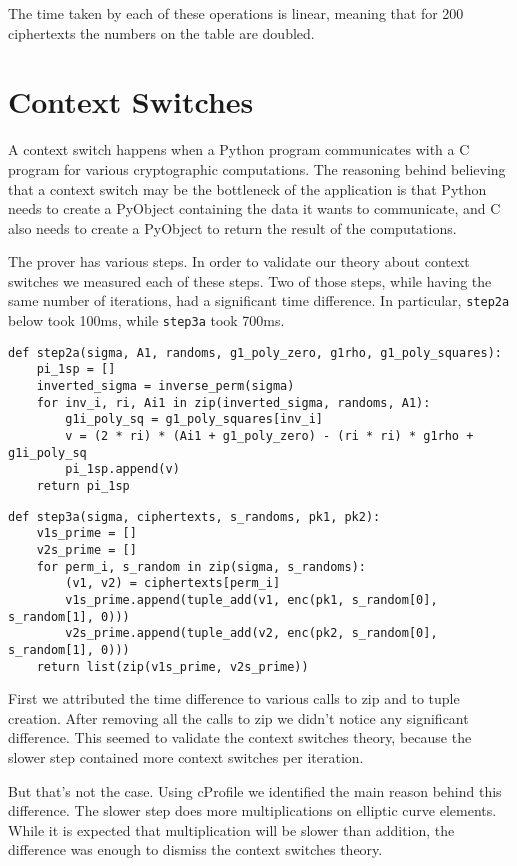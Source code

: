 \documentclass{article}
\begin{document}
The time taken by each of these operations is linear, meaning that for
200 ciphertexts the numbers on the table are doubled.

\section{Context Switches}

A context switch happens when a Python program communicates with a C
program for various cryptographic computations. The reasoning behind
believing that a context switch may be the bottleneck of the application
is that Python needs to create a PyObject containing the
data it wants to communicate, and C also needs to create a PyObject to
return the result of the computations.

The prover has various steps. In order to validate our theory about
context switches we measured each of these steps. Two of those steps,
while having the same number of iterations, had a significant time
difference. In particular, \texttt{step2a} below took
100ms, while \texttt{step3a} took 700ms.

\begin{verbatim}
def step2a(sigma, A1, randoms, g1_poly_zero, g1rho, g1_poly_squares):
    pi_1sp = []
    inverted_sigma = inverse_perm(sigma)
    for inv_i, ri, Ai1 in zip(inverted_sigma, randoms, A1):
        g1i_poly_sq = g1_poly_squares[inv_i]
        v = (2 * ri) * (Ai1 + g1_poly_zero) - (ri * ri) * g1rho + g1i_poly_sq
        pi_1sp.append(v)
    return pi_1sp
  \end{verbatim}

\begin{verbatim}
def step3a(sigma, ciphertexts, s_randoms, pk1, pk2):
    v1s_prime = []
    v2s_prime = []
    for perm_i, s_random in zip(sigma, s_randoms):
        (v1, v2) = ciphertexts[perm_i]
        v1s_prime.append(tuple_add(v1, enc(pk1, s_random[0], s_random[1], 0)))
        v2s_prime.append(tuple_add(v2, enc(pk2, s_random[0], s_random[1], 0)))
    return list(zip(v1s_prime, v2s_prime))
\end{verbatim}
  
\noindent
First we attributed the time difference to various calls to zip and to tuple
creation. After removing all the calls to zip we didn't notice any significant
difference. This seemed to validate the context switches theory, because the
slower step contained more context switches per iteration.

But that's not the case. Using cProfile we identified the main
reason behind this difference. The slower step does more multiplications on
elliptic curve elements. While it is expected that multiplication will be slower
than addition, the difference was enough to dismiss the context switches theory.
\end{document}

